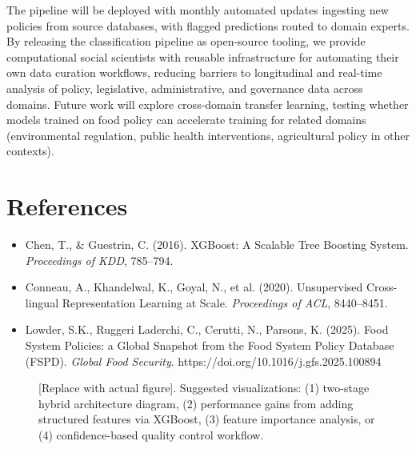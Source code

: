 \documentclass[a4paper,12pt]{article}
\begin{document}
The pipeline will be deployed with monthly automated updates ingesting new policies from source databases, with flagged predictions routed to domain experts. By releasing the classification pipeline as open-source tooling, we provide computational social scientists with reusable infrastructure for automating their own data curation workflows, reducing barriers to longitudinal and real-time analysis of policy, legislative, administrative, and governance data across domains. Future work will explore cross-domain transfer learning, testing whether models trained on food policy can accelerate training for related domains (environmental regulation, public health interventions, agricultural policy in other contexts).

\section*{References}

\small
\begin{itemize}
\itemsep0pt
\item Chen, T., \& Guestrin, C. (2016). XGBoost: A Scalable Tree Boosting System. \textit{Proceedings of KDD}, 785--794.
\item Conneau, A., Khandelwal, K., Goyal, N., et al. (2020). Unsupervised Cross-lingual Representation Learning at Scale. \textit{Proceedings of ACL}, 8440--8451.
\item Lowder, S.K., Ruggeri Laderchi, C., Cerutti, N., Parsons, K. (2025). Food System Policies: a Global Snapshot from the Food System Policy Database (FSPD). \textit{Global Food Security}. https://doi.org/10.1016/j.gfs.2025.100894
\end{itemize}

\newpage

\begin{figure}[htp]
\centering
{}
\caption{[Replace with actual figure]. Suggested visualizations: (1) two-stage hybrid architecture diagram, (2) performance gains from adding structured features via XGBoost, (3) feature importance analysis, or (4) confidence-based quality control workflow.}
\label{fig:placeholder}
\end{figure}
\end{document}
